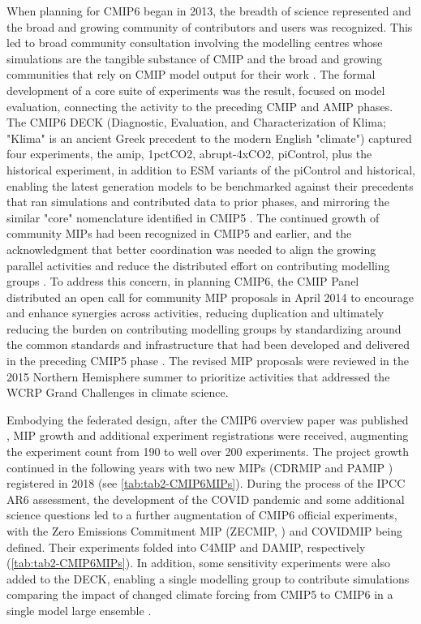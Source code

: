 \documentclass[gmd, preprint]{copernicus}
\begin{document}
When planning for CMIP6 began in 2013, the breadth of science represented and the broad and growing community of contributors and users was recognized. This led to broad community consultation involving the modelling centres whose simulations are the tangible substance of CMIP and the broad and growing communities that rely on CMIP model output for their work \citep{eyring_overview_2016}. The formal development of a core suite of experiments was the result, focused on model evaluation, connecting the activity to the preceding CMIP and AMIP phases. The CMIP6 DECK (Diagnostic, Evaluation, and Characterization of Klima; "Klima" is an ancient Greek precedent to the modern English "climate") captured four experiments, the amip, 1pctCO2, abrupt-4xCO2, piControl, plus the historical experiment, in addition to ESM variants of the piControl and historical, enabling the latest generation models to be benchmarked against their precedents that ran simulations and contributed data to prior phases, and mirroring the similar "core" nomenclature identified in CMIP5 \citep{stouffer_cmip5_2011}. The continued growth of community MIPs had been recognized in CMIP5 and earlier, and the acknowledgment that better coordination was needed to align the growing parallel activities and reduce the distributed effort on contributing modelling groups \citep{eyring_overview_2016}. To address this concern, in planning CMIP6, the CMIP Panel distributed an open call for community MIP proposals in April 2014 to encourage and enhance synergies across activities, reducing duplication and ultimately reducing the burden on contributing modelling groups by standardizing around the common standards and infrastructure that had been developed and delivered in the preceding CMIP5 phase \citep{eyring_overview_2016}. The revised MIP proposals were reviewed in the 2015 Northern Hemisphere summer to prioritize activities that addressed the WCRP Grand Challenges in climate science.

Embodying the federated design, after the CMIP6 overview paper was published \citet{eyring_overview_2016}, MIP growth and additional experiment registrations were received, augmenting the experiment count from 190 to well over 200 experiments. The project growth continued in the following years with two new MIPs (CDRMIP \citet{keller_carbon_2018} and PAMIP \citet{smith_polar_2019}) registered in 2018 (see \autoref{tab:tab2-CMIP6MIPs}). During the process of the IPCC AR6 assessment, the development of the COVID pandemic and some additional science questions led to a further augmentation of CMIP6 official experiments, with the Zero Emissions Commitment MIP (ZECMIP, \citet{jones_zero_2019}) and COVIDMIP \citep{lamboll_modifying_2021} being defined. Their experiments folded into C4MIP and DAMIP, respectively (\autoref{tab:tab2-CMIP6MIPs}). In addition, some sensitivity experiments were also added to the DECK, enabling a single modelling group to contribute simulations comparing the impact of changed climate forcing from CMIP5 to CMIP6 in a single model large ensemble \citep{fyfe_significant_2021}.
\end{document}

